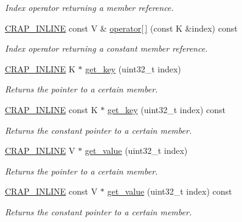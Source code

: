 \begin{DoxyCompactItemize}
\begin{DoxyCompactList}\small\item\em Index operator returning a member reference. \end{DoxyCompactList}\item 
\hyperlink{config__x86_8h_a5a40526b8d842e7ff731509998bb0f1c}{C\+R\+A\+P\+\_\+\+I\+N\+L\+I\+N\+E} const V \& \hyperlink{classcrap_1_1list__map_a3f6983c4e818f30184e7d7e91933efce}{operator\mbox{[}$\,$\mbox{]}} (const K \&index) const 
\begin{DoxyCompactList}\small\item\em Index operator returning a constant member reference. \end{DoxyCompactList}\item 
\hyperlink{config__x86_8h_a5a40526b8d842e7ff731509998bb0f1c}{C\+R\+A\+P\+\_\+\+I\+N\+L\+I\+N\+E} K $\ast$ \hyperlink{classcrap_1_1list__map_a38d9d20171c55119ef89d7c4c829d522}{get\+\_\+key} (uint32\+\_\+t index)
\begin{DoxyCompactList}\small\item\em Returns the pointer to a certain member. \end{DoxyCompactList}\item 
\hyperlink{config__x86_8h_a5a40526b8d842e7ff731509998bb0f1c}{C\+R\+A\+P\+\_\+\+I\+N\+L\+I\+N\+E} const K $\ast$ \hyperlink{classcrap_1_1list__map_a759916fe78e7e079ebad95cae52a0699}{get\+\_\+key} (uint32\+\_\+t index) const 
\begin{DoxyCompactList}\small\item\em Returns the constant pointer to a certain member. \end{DoxyCompactList}\item 
\hyperlink{config__x86_8h_a5a40526b8d842e7ff731509998bb0f1c}{C\+R\+A\+P\+\_\+\+I\+N\+L\+I\+N\+E} V $\ast$ \hyperlink{classcrap_1_1list__map_aaff7794d23da5c36ffabd64dc9ee084d}{get\+\_\+value} (uint32\+\_\+t index)
\begin{DoxyCompactList}\small\item\em Returns the pointer to a certain member. \end{DoxyCompactList}\item 
\hyperlink{config__x86_8h_a5a40526b8d842e7ff731509998bb0f1c}{C\+R\+A\+P\+\_\+\+I\+N\+L\+I\+N\+E} const V $\ast$ \hyperlink{classcrap_1_1list__map_a8117eb94681cc0960c583ca56fffe5ef}{get\+\_\+value} (uint32\+\_\+t index) const 
\begin{DoxyCompactList}\small\item\em Returns the constant pointer to a certain member. \end{DoxyCompactList}\item 

\end{DoxyCompactItemize}
